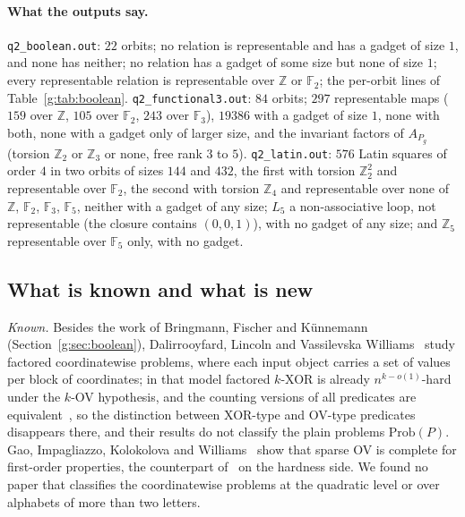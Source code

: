 \documentclass[11pt]{article}
\theoremstyle{definition}
\theoremstyle{remark}
\newcommand{\Z}{\mathbb{Z}}
\newcommand{\F}{\mathbb{F}_2}
\newcommand{\Prob}{\mathrm{Prob}}
\begin{document}
\paragraph{What the outputs say.} \texttt{q2\_boolean.out}: $22$ orbits; no relation is representable and has a gadget of size $1$, and none has neither; no relation has a gadget of some size but none of size $1$; every representable relation is representable over $\Z$ or $\F$; the per-orbit lines of Table~\ref{g:tab:boolean}. \texttt{q2\_functional3.out}: $84$ orbits; $297$ representable maps ($159$ over $\Z$, $105$ over $\F$, $243$ over $\mathbb F_3$), $19386$ with a gadget of size $1$, none with both, none with a gadget only of larger size, and the invariant factors of $A_{P_g}$ (torsion $\Z_2$ or $\Z_3$ or none, free rank $3$ to $5$). \texttt{q2\_latin.out}: $576$ Latin squares of order $4$ in two orbits of sizes $144$ and $432$, the first with torsion $\Z_2^2$ and representable over $\F$, the second with torsion $\Z_4$ and representable over none of $\Z$, $\F$, $\mathbb F_3$, $\mathbb F_5$, neither with a gadget of any size; $L_5$ a non-associative loop, not representable (the closure contains $(0,0,1)$), with no gadget of any size; and $\Z_5$ representable over $\mathbb F_5$ only, with no gadget.

\subsection{What is known and what is new}\label{g:sec:coordremarks}

\emph{Known.} Besides the work of Bringmann, Fischer and Künnemann~\cite{BFK19} (Section~\ref{g:sec:boolean}), Dalirrooyfard, Lincoln and Vassilevska Williams~\cite{DLW20} study factored coordinatewise problems, where each input object carries a set of values per block of coordinates; in that model factored $k$-XOR is already $n^{k-o(1)}$-hard under the $k$-OV hypothesis, and the counting versions of all predicates are equivalent~\cite[Theorems~1.1 and 1.7--1.9]{DLW20}, so the distinction between XOR-type and OV-type predicates disappears there, and their results do not classify the plain problems $\Prob(P)$. Gao, Impagliazzo, Kolokolova and Williams~\cite{GIKW17} show that sparse OV is complete for first-order properties, the counterpart of~\cite{BFK19} on the hardness side. We found no paper that classifies the coordinatewise problems at the quadratic level or over alphabets of more than two letters.
\end{document}
